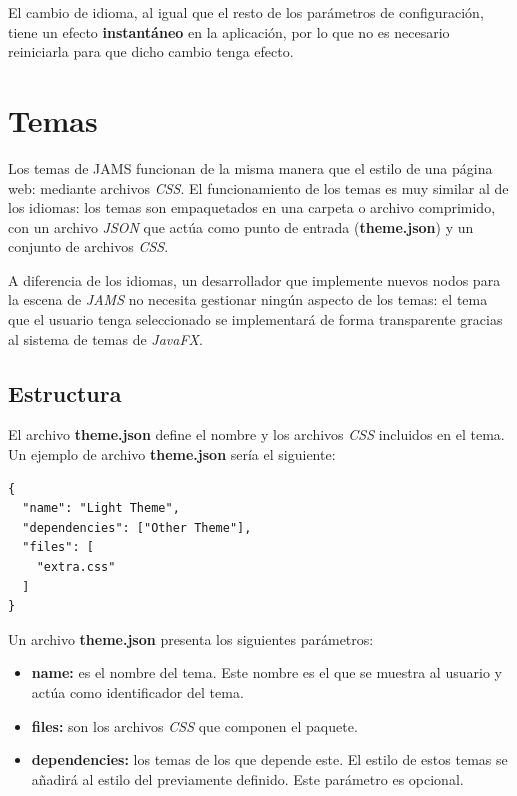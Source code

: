 El cambio de idioma, al igual que el resto de los parámetros de configuración,
tiene un efecto \textbf{instantáneo} en la aplicación, por lo que no es necesario
reiniciarla para que dicho cambio tenga efecto.


\section{Temas}\label{sec:temas}

Los temas de JAMS funcionan de la misma manera que el estilo de una página web:
mediante archivos \textit{CSS}\cite{CSS}.
El funcionamiento de los temas es muy similar al de los idiomas:
los temas son empaquetados en una carpeta o archivo comprimido,
con un archivo \textit{JSON} que actúa como punto de entrada (\textbf{theme.json})
y un conjunto de archivos \textit{CSS}.

A diferencia de los idiomas, un desarrollador que implemente nuevos
nodos para la escena de \textit{JAMS} no necesita gestionar ningún aspecto
de los temas: el tema que el usuario tenga seleccionado se implementará
de forma transparente gracias al sistema de temas de \textit{JavaFX}.

\subsection{Estructura}\label{subsec:estructura}

El archivo \textbf{theme.json} define el nombre y los archivos
\textit{CSS} incluidos en el tema.
Un ejemplo de archivo \textbf{theme.json} sería el siguiente:
\begin{lstlisting}[frame=single,label={lst:theme.json}]
{
  "name": "Light Theme",
  "dependencies": ["Other Theme"],
  "files": [
    "extra.css"
  ]
}
\end{lstlisting}

Un archivo \textbf{theme.json} presenta los siguientes parámetros:
\begin{itemize}
    \item \textbf{name:} es el nombre del tema.
    Este nombre es el que se muestra al usuario
    y actúa como identificador del tema.
    \item \textbf{files:} son los archivos \textit{CSS} que componen el paquete.
    \item \textbf{dependencies:} los temas de los que depende este.
    El estilo de estos temas se añadirá al estilo del previamente definido.
    Este parámetro es opcional.
\end{itemize}

